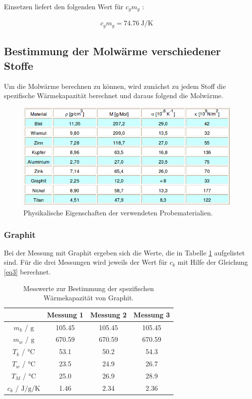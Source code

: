 Einsetzen liefert den folgenden Wert für $c_g m_g$ :

\begin{align*}
  c_g m_g = \SI{74.76}{\joule\per\kelvin}
\end{align*}

\subsection{Bestimmung der Molwärme verschiedener Stoffe}
Um die Molwärme berechnen zu können, wird zunächst zu jedem Stoff die spezifische Wärmekapazität berechnet
und daraus folgend die Molwärme.

\begin{figure}[h]
  \centering
  \includegraphics[scale = 0.5]{Tabelle.png}
  \caption{Physikalische Eigenschaften der verwendeten Probematerialien. \cite{Quelle}}
  \label{Abb2}
\end{figure}

\newpage
\subsubsection{Graphit}
Bei der Messung mit Graphit ergeben sich die Werte, die in Tabelle \ref{tab2} aufgelistet sind. Für die
drei Messungen wird jeweils der Wert für $c_k$ mit Hilfe der Gleichung \eqref{eq3} berechnet.

\begin{table}
  \centering
  \caption{Messwerte zur Bestimmung der spezifischen Wärmekapazität von Graphit.}
  \label{tab2}
  \begin{tabular}{c | c c c}
    \toprule
    & Messung 1 & Messung 2 & Messung 3 \\
    \midrule
    $m_k$ / $\si{\gram}$ & 105.45 & 105.45 & 105.45 \\
    $m_w$ / $\si{\gram}$ & 670.59 & 670.59 & 670.59 \\
    $T_k$ / $\si{\celsius}$ & 53.1 & 50.2 & 54.3 \\
    $T_w$ / $\si{\celsius}$ & 23.5 & 24.9 & 26.7 \\
    $T_M$ / $\si{\celsius}$ & 25.0 & 26.9 & 28.9 \\
    \midrule
    $c_k$ / $\si{\joule\per\gram\per\kelvin}$ & 1.46 & 2.34 & 2.36 \\
    \bottomrule
  \end{tabular}
\end{table}


